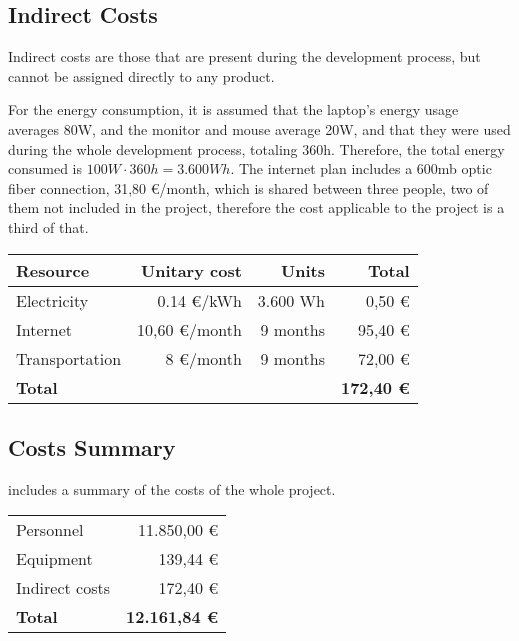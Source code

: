 \subsection{Indirect Costs}
Indirect costs are those that are present during the development process, but cannot be assigned directly to any product.

For the energy consumption, it is assumed that the laptop's energy usage averages 80W, and the monitor and mouse average 20W, and that they were used during the whole development process, totaling 360h. Therefore, the total energy consumed is $100W \cdot 360 h = 3.600 Wh$. The internet plan includes a 600mb optic fiber connection, 31,80 \euro/month, which is shared between three people, two of them not included in the project, therefore the cost applicable to the project is a third of that.


\begin{table}[htb]
    {
      \begin{tabular}{lrrr}
        \toprule
        \textbf{Resource} & \textbf{Unitary cost} & \textbf{Units} & \textbf{Total} \\
        \midrule
        Electricity    &     0.14 \euro/kWh & 3.600 Wh &  0,50 \euro \\
        Internet       &  10,60 \euro/month & 9 months & 95,40 \euro \\
        Transportation &      8 \euro/month & 9 months & 72,00 \euro \\
        \midrule
        \textbf{Total} & & & \textbf{172,40 \euro} \\
        \bottomrule
      \end{tabular}
    }
\end{table}


\subsection{Costs Summary}\label{subsec:cost-summary}
 includes a summary of the costs of the whole project.

\begin{table}[htb]
    {
      \begin{tabular}{p{5cm}r}
        \toprule
        Personnel          & 11.850,00 \euro \\
        Equipment          &    139,44 \euro \\
        Indirect costs     &    172,40 \euro \\
        \midrule
        \textbf{Total}     & \textbf{12.161,84 \euro} \\
        \bottomrule
      \end{tabular}
    }
\end{table}

